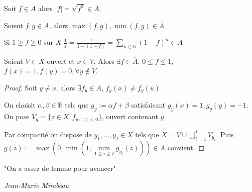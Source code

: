\begin{corollaire}
	Soit $f \in A$ alors $|f| = \sqrt{f^2}  \in \overline{A}$.

	Soient $f,g \in A$, alors $\max\left( f,g \right), \min\left( f,g \right) \in \overline{A}$

	Si $1\ge f\ge 0$ sur $X$ $\frac{1}{f} = \frac{1}{1-(1-f)}= \sum_{n\in \mathbb{N}} (1-f)^n \in \overline{A}$
\end{corollaire}
\begin{lemme}
	Soient $V\subset X$ ouvert et $x \in V$.
	Alors $\exists f \in \overline{A}$, $0\le f\le 1$, $f(x)=1, f(y) = 0, \forall y \not\in V$.
\end{lemme}
\begin{proof}
Soit $y\neq x$. alors $\exists  f_y \in A$, $f_y\left( x \right) \neq  f_{y}\left( u \right)$

On choisit $\alpha,\beta \in \mathbb{R}$ tels que $g_{y} := \alpha f + \beta $ satisfaisant $g_{y}\left( x \right) =1, g_{y}\left( y \right)=-1$.
On pose $V_g= \{z \in X : f_{y\left( z \right) <0}\} $, ouvert contenant $y$.

Par compacité on dispose de $y_1,\ldots,y_I \in X$ tels que $X = V \cup \bigcup_{i=1} ^I V_{y_i}$. Puis $g\left( z \right)  := \max\left( 0, \min\left( 1, \min \limits_{1\le i\le I} g_{y_i}\left( z \right)  \right)  \right) \in \overline{A}$ convient.
\end{proof}
\epigraph{"On a assez de lemme pour avancer"}{\textit{Jean-Marie Mirebeau}}

